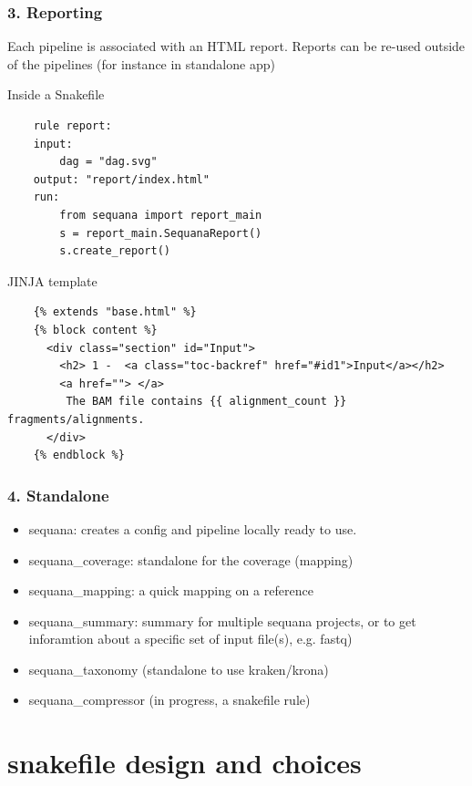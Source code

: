 \documentclass{beamer}
\begin{document}
\begin{frame}[fragile]
    \frametitle{3. Reporting}
    Each pipeline is associated with an HTML report. Reports can be re-used 
    outside of the pipelines (for instance in standalone app)
    \begin{block}{Inside a Snakefile}
    \begin{lstlisting}
    rule report:
    input:
        dag = "dag.svg"
    output: "report/index.html"
    run:
        from sequana import report_main
        s = report_main.SequanaReport()
        s.create_report()
    \end{lstlisting}
    \end{block}
    
    \begin{block}{JINJA template}
    \begin{lstlisting}
    {% extends "base.html" %}
    {% block content %}
      <div class="section" id="Input">
        <h2> 1 -  <a class="toc-backref" href="#id1">Input</a></h2>
        <a href=""> </a>
         The BAM file contains {{ alignment_count }} fragments/alignments.
      </div>
    {% endblock %}
  \end{lstlisting}
   \end{block}

 
\end{frame}



\begin{frame}[fragile]
    \frametitle{4. Standalone}
    
    \begin{itemize}
     \item sequana: creates a config and pipeline locally ready to use.
     \item sequana\_coverage: standalone for the coverage (mapping) 
     \item sequana\_mapping:  a quick mapping on a reference
     \item sequana\_summary: summary for multiple sequana projects, or to get inforamtion about a specific set of input file(s), e.g. fastq)
     \item sequana\_taxonomy (standalone to use kraken/krona)   
     \item sequana\_compressor  (in progress, a snakefile rule)
    \end{itemize}   
\end{frame}



\section{snakefile design and choices}
\end{document}
